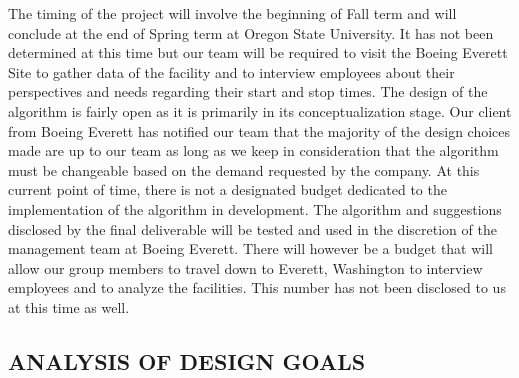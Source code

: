 \documentclass[a4,draftclsnofoot,onecolumn,margin=0.75,10pt]{IEEEtran}
\begin{document}
{   The timing of the project will involve the beginning of Fall term and will conclude at the end of Spring term at Oregon State University. It has not been determined at this time but our team will be required to visit the Boeing Everett Site to gather data of the facility and to interview employees about their perspectives and needs regarding their start and stop times. The design of the algorithm is fairly open as it is primarily in its conceptualization stage. Our client from Boeing Everett has notified our team that the majority of the design choices made are up to our team as long as we keep in consideration that the algorithm must be changeable based on the demand requested by the company. At this current point of time, there is not a designated budget dedicated to the implementation of the algorithm in development. The algorithm and suggestions disclosed by the final deliverable will be tested and used in the discretion of the management team at Boeing Everett. There will however be a budget that will allow our group members to travel down to Everett, Washington to interview employees and to analyze the facilities. This number has not been disclosed to us at this time as well.}


\subsection[ANALYSIS OF DESIGN GOALS]{\rmfamily\bfseries\color{black}
ANALYSIS OF DESIGN GOALS}
\end{document}
